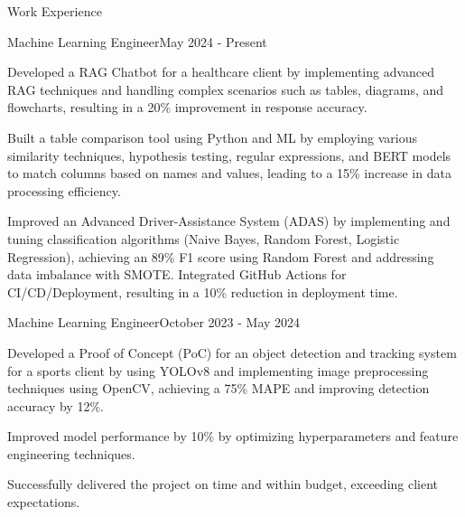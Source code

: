 \documentclass{resume} %
\begin{document}
    \begin{rSection}{Work Experience}
                    \begin{rSubsection}
                {Machine Learning Engineer}{May 2024 - Present}
                                    {}
                                {}
                                    \item Developed a RAG Chatbot for a healthcare client by implementing advanced RAG techniques and handling complex scenarios such as tables, diagrams, and flowcharts, resulting in a 20\% improvement in response accuracy.
                                    \item Built a table comparison tool using Python and ML by employing various similarity techniques, hypothesis testing, regular expressions, and BERT models to match columns based on names and values, leading to a 15\% increase in data processing efficiency.
                                    \item Improved an Advanced Driver{-}Assistance System (ADAS) by implementing and tuning classification algorithms (Naive Bayes, Random Forest, Logistic Regression), achieving an 89\% F1 score using Random Forest and addressing data imbalance with SMOTE. Integrated GitHub Actions for CI/CD/Deployment, resulting in a 10\% reduction in deployment time.
                            \end{rSubsection}
                    \begin{rSubsection}
                {Machine Learning Engineer}{October 2023 - May 2024}
                                    {}
                                {}
                                    \item Developed a Proof of Concept (PoC) for an object detection and tracking system for a sports client by using YOLOv8 and implementing image preprocessing techniques using OpenCV, achieving a 75\% MAPE and improving detection accuracy by 12\%.
                                    \item Improved model performance by 10\% by optimizing hyperparameters and feature engineering techniques. 
                                    \item Successfully delivered the project on time and within budget, exceeding client expectations.
                            \end{rSubsection}

\end{rSection}
\end{document}
